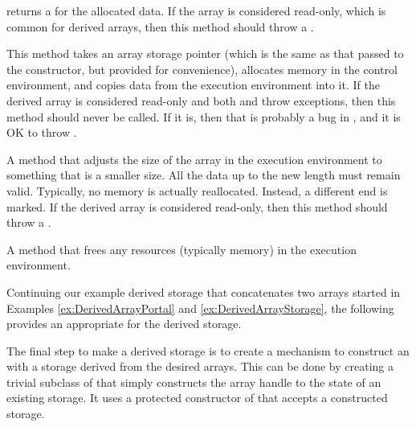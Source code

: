 \begin{description}
  returns a  for the allocated data. If the array
  is considered read-only, which is common for derived arrays, then this
  method should throw a .
\item[\textcode{RetrieveOutputData}] This method takes an array storage
  pointer (which is the same as that passed to the constructor, but
  provided for convenience), allocates memory in the control environment,
  and copies data from the execution environment into it. If the derived
  array is considered read-only and both  and
   throw exceptions, then this method should
  never be called. If it is, then that is probably a bug in
  , and it is OK to throw
  .
\item[\textcode{Shrink}] A method that adjusts the size of the array in the
  execution environment to something that is a smaller size. All the data
  up to the new length must remain valid. Typically, no memory is actually
  reallocated. Instead, a different end is marked. If the derived array is
  considered read-only, then this method should throw a
  .
\item[\textcode{ReleaseResources}] A method that frees any resources
  (typically memory) in the execution environment.
\end{description}

Continuing our example derived storage that concatenates two arrays
started in Examples \ref{ex:DerivedArrayPortal} and
\ref{ex:DerivedArrayStorage}, the following provides an
 appropriate for the derived storage.



The final step to make a derived storage is to create a mechanism to
construct an  with a storage derived from the
desired arrays. This can be done by creating a trivial subclass of
 that simply constructs the array handle to the state
of an existing storage. It uses a protected constructor of
 that accepts a constructed storage.


